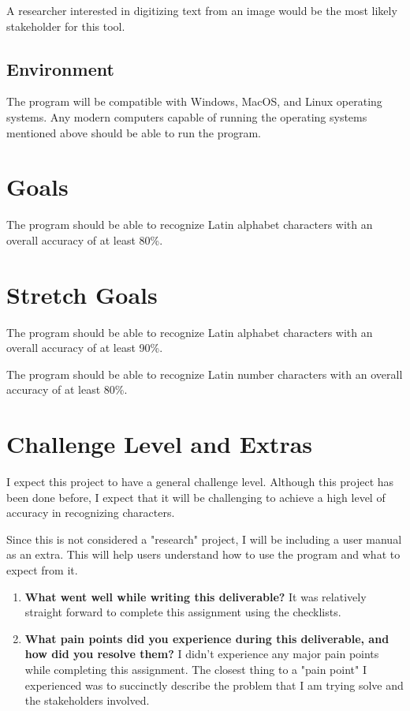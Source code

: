 \documentclass{article}
\begin{document}
A researcher interested in digitizing text from an image would be the most
likely stakeholder for this tool.

\subsection{Environment}

The program will be compatible with Windows, MacOS, and Linux operating systems.
Any modern computers capable of running the operating systems mentioned above
should be able to run the program.

\section{Goals}

The program should be able to recognize Latin alphabet characters with an
overall accuracy of at least 80\%.

\section{Stretch Goals}

The program should be able to recognize Latin alphabet characters with an
overall accuracy of at least 90\%.

The program should be able to recognize Latin number characters with an overall
accuracy of at least 80\%.

\section{Challenge Level and Extras}

I expect this project to have a general challenge level. Although this project
has been done before, I expect that it will be challenging to achieve a high
level of accuracy in recognizing characters.

Since this is not considered a "research" project, I will be including a user
manual as an extra. This will help users understand how to use the program and
what to expect from it.

\newpage{}

\begin{enumerate}
    \item {\bfseries What went well while writing this deliverable?} It was
    relatively straight forward to complete this assignment using the
    checklists.
    \item {\bfseries What pain points did you experience during this
    deliverable, and how did you resolve them?} I didn't experience any major
    pain points while completing this assignment. The closest thing to a "pain
    point" I experienced was to succinctly describe the problem that I am trying
    solve and the stakeholders involved. 
\end{enumerate}  
\end{document}

